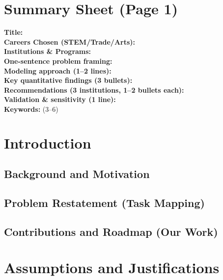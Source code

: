 
\section*{Summary Sheet (Page 1)}
\textbf{Title:} \\
\textbf{Careers Chosen (STEM/Trade/Arts):} \\
\textbf{Institutions \& Programs:} \\
\textbf{One-sentence problem framing:} \\
\textbf{Modeling approach (1–2 lines):} \\
\textbf{Key quantitative findings (3 bullets):} \\
\textbf{Recommendations (3 institutions, 1–2 bullets each):} \\
\textbf{Validation \& sensitivity (1 line):} \\
\textbf{Keywords:} (3–6)

\newpage
\tableofcontents
\newpage

\section{Introduction}
\subsection{Background and Motivation}
\subsection{Problem Restatement (Task Mapping)}
\subsection{Contributions and Roadmap (Our Work)}

\section{Assumptions and Justifications}

